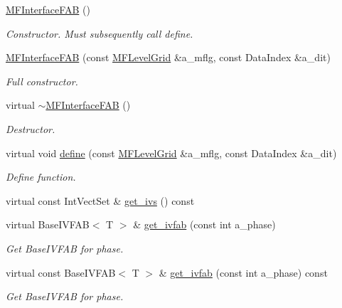 \begin{DoxyCompactItemize}
\item 
\hyperlink{classMFInterfaceFAB_a0c1665a8fb77aac838aab83eaf8e379e}{M\+F\+Interface\+F\+AB} ()
\begin{DoxyCompactList}\small\item\em Constructor. Must subsequently call define. \end{DoxyCompactList}\item 
\hyperlink{classMFInterfaceFAB_a9e9773180f04247c742b4fba03c82bf2}{M\+F\+Interface\+F\+AB} (const \hyperlink{classMFLevelGrid}{M\+F\+Level\+Grid} \&a\+\_\+mflg, const Data\+Index \&a\+\_\+dit)
\begin{DoxyCompactList}\small\item\em Full constructor. \end{DoxyCompactList}\item 
virtual \hyperlink{classMFInterfaceFAB_abe1fc32723df554f115e66b0230ad74e}{$\sim$\+M\+F\+Interface\+F\+AB} ()
\begin{DoxyCompactList}\small\item\em Destructor. \end{DoxyCompactList}\item 
virtual void \hyperlink{classMFInterfaceFAB_a7633295f84a0b37e340139db18dc3247}{define} (const \hyperlink{classMFLevelGrid}{M\+F\+Level\+Grid} \&a\+\_\+mflg, const Data\+Index \&a\+\_\+dit)
\begin{DoxyCompactList}\small\item\em Define function. \end{DoxyCompactList}\item 
virtual const Int\+Vect\+Set \& \hyperlink{classMFInterfaceFAB_a02673762a18520cc038a492136c4bf35}{get\+\_\+ivs} () const 
\item 
virtual Base\+I\+V\+F\+AB$<$ T $>$ \& \hyperlink{classMFInterfaceFAB_a269af754b7786f75a3e3cdca5c2f262b}{get\+\_\+ivfab} (const int a\+\_\+phase)
\begin{DoxyCompactList}\small\item\em Get Base\+I\+V\+F\+AB for phase. \end{DoxyCompactList}\item 
virtual const Base\+I\+V\+F\+AB$<$ T $>$ \& \hyperlink{classMFInterfaceFAB_aa9f44560befd3191d279009d32f70636}{get\+\_\+ivfab} (const int a\+\_\+phase) const 
\begin{DoxyCompactList}\small\item\em Get Base\+I\+V\+F\+AB for phase. \end{DoxyCompactList}\item 

\end{DoxyCompactItemize}
